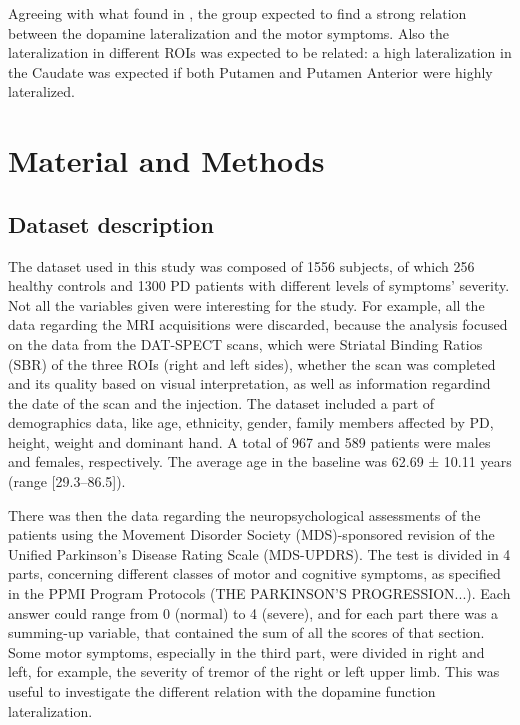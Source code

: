 \documentclass[]{article}
\begin{document}
\begin{multicols}{2}
\newline
Agreeing with what found in \cite{pirker_correlation_2003}, the group expected to find a strong relation between the dopamine lateralization and the motor symptoms. Also the lateralization in different ROIs was expected to be related: a high lateralization in the Caudate was expected if both Putamen and Putamen Anterior were highly lateralized. 

\section{Material and Methods}

\subsection{Dataset description}
The dataset used in this study was composed of 1556 subjects, of which 256 healthy controls and 1300 PD patients with different levels of symptoms' severity. Not all the variables given were interesting for the study. For example, all the data regarding the MRI acquisitions were discarded, because the analysis focused on the data from the DAT-SPECT scans, which were Striatal Binding Ratios (SBR) of the three ROIs (right and left sides), whether the scan was completed and its quality based on visual interpretation, as well as information regardind the date of the scan and the injection. 
\newline
The dataset included a part of demographics data, like age, ethnicity, gender, family members affected by PD, height, weight and dominant hand.
A total of 967 and 589 patients were males and females, respectively. The average age in the baseline was 62.69 ± 10.11 years (range [29.3–86.5]). 

There was then the data regarding the neuropsychological assessments of the patients using the Movement Disorder Society (MDS)-sponsored revision of the Unified Parkinson's Disease Rating Scale (MDS-UPDRS). The test is divided in 4 parts, concerning different classes of motor and cognitive symptoms, as specified in the PPMI Program Protocols (THE PARKINSON'S PROGRESSION...). Each answer could range from 0 (normal) to 4 (severe), and for each part there was a summing-up variable, that contained the sum of all the scores of that section. Some motor symptoms, especially in the third part, were divided in right and left, for example, the severity of tremor of the right or left upper limb. This was useful to investigate the different relation with the dopamine function lateralization.
\newline


\end{multicols}
\end{document}
